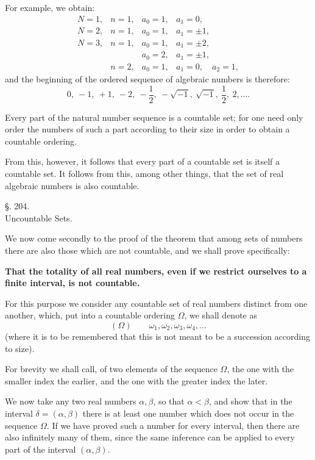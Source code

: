 \documentclass[11pt]{article}
\begin{document}
For example, we obtain:
\[
\begin{array}{llll}
N=1, & n=1, & a_0=1, & a_1=0,\\
N=2, & n=1, & a_0=1, & a_1=\pm1,\\
N=3, & n=1, & a_0=1, & a_1=\pm2,\\
     &      & a_0=2, & a_1=\pm1,\\
     & n=2, & a_0=1, & a_1=0,\quad a_2=1,
\end{array}
\]
and the beginning of the ordered sequence of algebraic numbers is therefore:
\[
0,\ -1,\ +1,\ -2,\ -\frac12,\ -\sqrt{-1},\ \sqrt{-1},\ \frac12,\ 2,\ldots .
\]

Every part of the natural number sequence is a countable set; for one need only order the numbers of such a part according to their size in order to obtain a countable ordering.

From this, however, it follows that every part of a countable set is itself a countable set. It follows from this, among other things, that the set of real algebraic numbers is also countable.

\begin{center}
{\large §. 204.}\\[0.4em]
{\large Uncountable Sets.}
\end{center}

We now come secondly to the proof of the theorem that among sets of numbers there are also those which are not countable, and we shall prove specifically:

\begin{center}
\textbf{That the totality of all real numbers, even if we restrict ourselves to a finite interval, is not countable.}
\end{center}

For this purpose we consider any countable set of real numbers distinct from one another, which, put into a countable ordering $\Omega$, we shall denote as
\[
(\Omega)\qquad \omega_1,\omega_2,\omega_3,\omega_4,\ldots
\]
(where it is to be remembered that this is not meant to be a succession according to size).

For brevity we shall call, of two elements of the sequence $\Omega$, the one with the smaller index the earlier, and the one with the greater index the later.

We now take any two real numbers $\alpha,\beta$, so that $\alpha<\beta$, and show that in the interval $\delta=(\alpha,\beta)$ there is at least one number which does not occur in the sequence $\Omega$. If we have proved such a number for every interval, then there are also infinitely many of them, since the same inference can be applied to every part of the interval $(\alpha,\beta)$.
\end{document}
